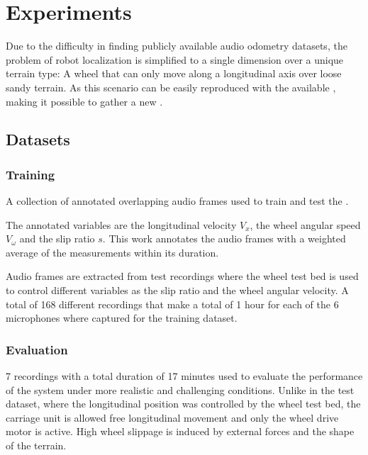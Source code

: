 \section{Experiments} \label{sec:experiments}

Due to the difficulty in finding publicly available audio odometry datasets,
the problem of robot localization is simplified to a single dimension over a
unique terrain type: A wheel that can only move along a longitudinal axis over
loose sandy terrain. As this scenario can be easily reproduced with the
available , making it possible to gather a
new . 



\subsection{Datasets} \label{subsec:datasets}

\subsubsection{Training} \label{subsubsec:training-dataset} A collection of
annotated overlapping audio frames used to train and test the
.

The annotated variables are the longitudinal velocity $V_x$, the wheel angular
speed $V_\omega$ and the slip ratio $s$. This work annotates the audio frames
with a weighted average of the measurements within its duration.

Audio frames are extracted from test recordings where the wheel test bed is
used to control different variables as the slip ratio and the wheel angular
velocity. A total of 168 different recordings that make a total of 1 hour for
each of the 6 microphones where captured for the training dataset.  

\subsubsection{Evaluation} \label{subsubsec:evaluatio-dataset} 7 recordings
with a total duration of 17 minutes used to evaluate the performance of the
system under more realistic and challenging conditions. Unlike in the test
dataset, where the longitudinal position was controlled by the wheel test bed,
the carriage unit is allowed free longitudinal movement and only the wheel
drive motor is active. High wheel slippage is induced by external forces and
the shape of the terrain.


